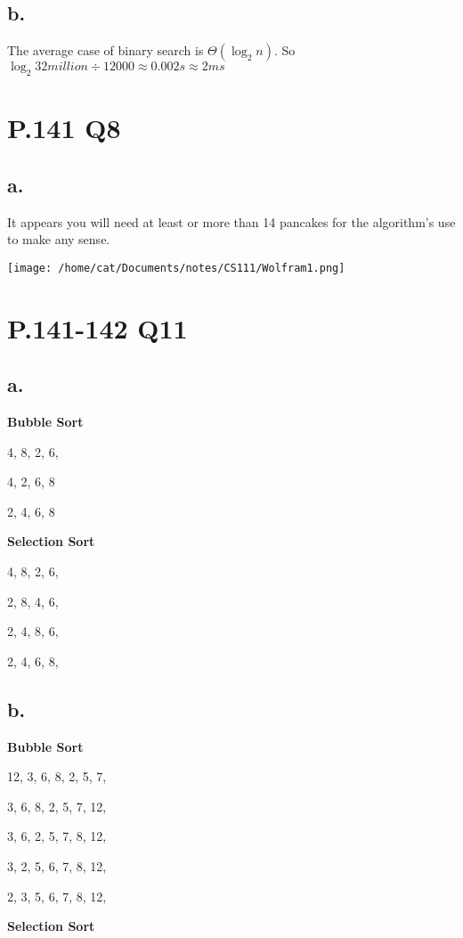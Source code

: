\documentclass{article}%
\begin{document}
\subsection*{b.}
The average case of binary search is $\Theta(\log_2 n)$. So $\log_2 32million \div 12000 \approx 0.002s \approx 2ms$

\section*{P.141 Q8}
\subsection*{a.}
It appears you will need at least or more than 14 pancakes for the algorithm's use to make any sense.

\texttt{[image: /home/cat/Documents/notes/CS111/Wolfram1.png]}

\clearpage
\section*{P.141-142 Q11}
\subsection*{a.}

\noindent \textbf{Bubble Sort}

4, 8, 2, 6, 

4, 2, 6, 8

2, 4, 6, 8

\noindent \textbf{Selection Sort}

4, 8, 2, 6, 

2, 8, 4, 6, 

2, 4, 8, 6, 

2, 4, 6, 8, \newline \newline

\subsection*{b.}
\noindent \textbf{Bubble Sort}

12, 3, 6, 8, 2, 5, 7, 

3, 6, 8, 2, 5, 7, 12, 

3, 6, 2, 5, 7, 8, 12, 

3, 2, 5, 6, 7, 8, 12, 

2, 3, 5, 6, 7, 8, 12, 

\noindent \textbf{Selection Sort}
\end{document}
